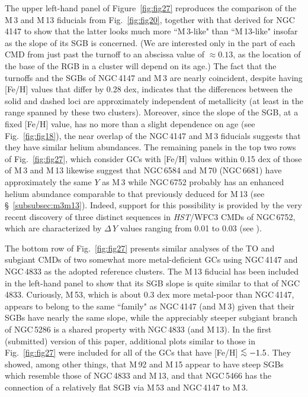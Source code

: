 \documentclass[12pt,preprint]{aastex}
\newcommand\lta{\mathrel{\hbox{\raise 0.6 ex \hbox{$<$}\kern
                   -1.8 ex\lower .5 ex\hbox{$\sim$}}}}
\begin{document}
The upper left-hand panel of Figure~\ref{fig:fig27} reproduces the comparison
of the M$\,$3 and M$\,$13 fiducials from Fig.~\ref{fig:fig20}, together with
that derived for NGC$\,$4147 to show that the latter looks much more
``M$\,$3-like" than ``M$\,$13-like" insofar as the slope of its SGB is
concerned.  (We are interested only in the part of each CMD from just past the
turnoff to an abscissa value of $\approx 0.13$, as the location of the base of
the RGB in a cluster will depend on its age.)  The fact that the turnoffs and
the SGBs of NGC$\,$4147 and M$\,$3 are nearly coincident, despite having [Fe/H]
values that differ by 0.28 dex, indicates that the differences between the
solid and dashed loci are approximately independent of metallicity (at least in
the range spanned by these two clusters).  Moreover, since the slope of the SGB,
at a fixed [Fe/H] value, has no more than a slight dependence on age (see
Fig.~\ref{fig:fig18}), the near overlap of the NGC$\,$4147 and M$\,$3 fiducials
suggests that they have similar helium abundances.  The remaining panels in the
top two rows of Fig.~\ref{fig:fig27}, which consider GCs with [Fe/H] values
within 0.15 dex of those of M$\,$3 and M$\,$13 likewise suggest that NGC$\,$6584
and M$\,$70 (NGC$\,$6681) have approximately the same $Y$ as M$\,$3 while
NGC$\,$6752 probably has an enhanced helium abundance comparable to that
previously deduced for M$\,$13 (see \S~\ref{subsubsec:m3m13}).  Indeed, support
for this possibility is provided by the very recent discovery of three distinct
sequences in {\it HST}/WFC3 CMDs of NGC$\,$6752, which are characterized by
$\Delta\,Y$ values ranging from 0.01 to 0.03 (see \citealt{mmp13}).

The bottom row of Fig.~\ref{fig:fig27} presents similar analyses of the TO and
subgiant CMDs of two somewhat more metal-deficient GCs using NGC$\,$4147 and
NGC$\,$4833 as the adopted reference clusters.  The M$\,$13 fiducial has
been included in the left-hand panel to show that its SGB slope is quite 
similar to that of NGC$\,$4833.  Curiously, M$\,$53, which is about 0.3
dex more metal-poor than NGC$\,$4147, appears to belong to the same ``family"
as NGC$\,$4147 (and M$\,$3) given that their SGBs have nearly the same slope,
while the appreciably steeper subgiant branch of NGC$\,$5286 is a shared
property with NGC$\,$4833 (and M$\,$13).  In the first (submitted) version of
this paper, additional plots similar to those in Fig.~\ref{fig:fig27} were
included for all of the GCs that have [Fe/H] $\lta -1.5$.  They showed, among
other things, that M$\,$92 and M$\,$15 appear to have steep SGBs which resemble
those of NGC$\,$4833 and M$\,$13, and that NGC$\,$5466 has the connection of a
relatively flat SGB via M$\,$53 and NGC$\,$4147 to M$\,$3. 
\end{document}

